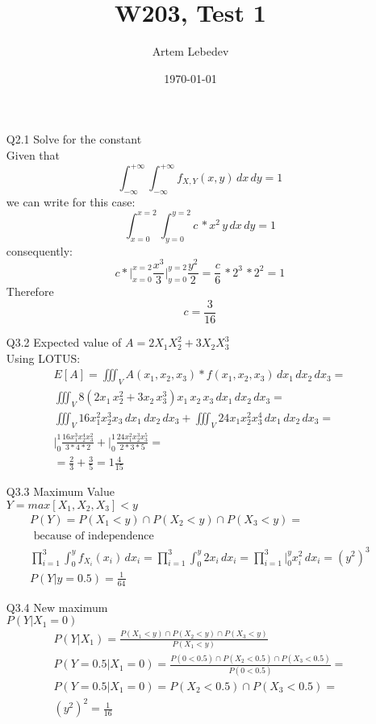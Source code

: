 \documentclass{article}
\author{Artem Lebedev}
\title{W203, Test 1}
\date{\today}
\begin{document}
\maketitle

\begin{enumerate}
\item[Q2.1] Solve for the constant\\
	Given that
	\begin{equation}
		\int_{-\infty}^{+\infty} \int_{-\infty}^{+\infty}f_{X,Y}(x,y) \,dx\,dy = 1
	\end{equation}
	we can write for this case:
	\begin{equation}
		\int_{x=0}^{x=2} \int_{y=0}^{y=2}c\,*x^2\,y \,dx\,dy = 1
	\end{equation}
	consequently:
	\begin{equation}
		c*\Big|_{x=0}^{x=2} \frac{x^3}{3}\Big|_{y=0}^{y=2}\frac{y^2}{2} = 
		\frac{c}{6}\,*2^3\,*2^2 = 1
	\end{equation}
	Therefore $$c = \frac{3}{16}$$

\item[Q3.2]Expected value of $A = 2X_1X^2_2+3X_2X^3_3$\\
	Using LOTUS:
	\begin{align*}
	E[A]=\iiint_V A(x_1,x_2,x_3)*f(x_1, x_2, x_3) \,dx_1\,dx_2\,dx_3=\\
	\iiint_V 8(2x_1\,x^2_2+3x_2\,x^3_3)x_1\,x_2\,x_3\,dx_1\,dx_2\,dx_3=\\
	\iiint_V 16x^2_1x^3_2x_3\,dx_1\,dx_2\,dx_3 + \iiint_V 24x_1x^2_2x^4_3\,dx_1\,dx_2\,dx_3=\\
	\Big|_0^1\frac{16x^3_1x^4_2x^2_3}{3*4*2}+\Big|_0^1\frac{24x^2_1x^3_2x^5_3}{2*3*5} = \\	
	= \frac{2}{3}+\frac{3}{5}=1\frac{4}{15}
	\end{align*}
\item[Q3.3]Maximum Value\\
$Y = max[X_1,X_2,X_3]<y$\\
	\begin{align*}
		P(Y) = P(X_1<y) \cap P(X_2<y) \cap P(X_3<y) =\\ \text{ because of independence} \\ \prod_{i=1}^{3} \int_0^y f_{X_i}(x_i)\,dx_i 
		= \prod_{i=1}^{3}\int_0^y 2x_i\,dx_i = \prod_{i=1}^{3}\Big|_0^y x_i^2\,dx_i = (y^2)^3\\
		P(Y|y = 0.5) = \frac{1}{64}
	\end{align*}
\item[Q3.4]New maximum\\
$P(Y|X_1 = 0)$\\
\begin{align*}
	P(Y|X_1) = \frac{P(X_1<y) \cap P(X_2<y) \cap P(X_3<y)}{P(X_1<y)}\\
	P(Y=0.5|X_1=0) = \frac{P(0<0.5) \cap P(X_2<0.5) \cap P(X_3<0.5)}{P(0<0.5)} = \\
		P(Y=0.5|X_1=0) = P(X_2<0.5) \cap P(X_3<0.5)=\\
		(y^2)^2 = \frac{1}{16}
\end{align*}
\end{enumerate}
\end{document}
